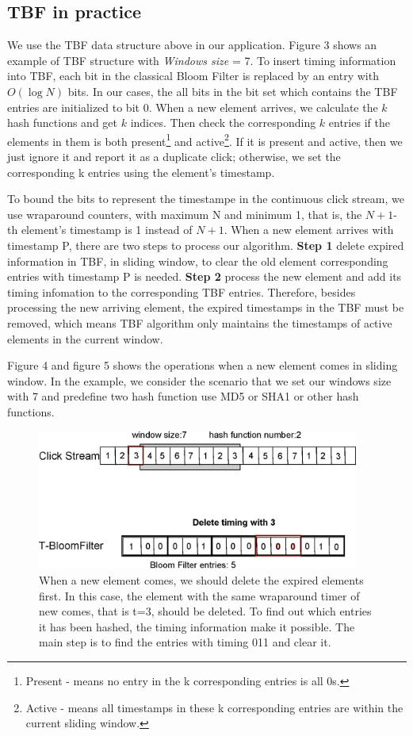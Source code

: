 \documentclass[runningheads,report]{llncs}
\begin{document}
\subsection{TBF in practice}

We use the TBF data structure above in our application. Figure 3 shows an example of TBF structure with \textit{Windows size} = 7. To insert timing information into TBF, each bit in the classical Bloom Filter is replaced by an entry with $O(\log N)$ bits. In our cases, the all bits in the bit set which contains the TBF entries are initialized to bit 0. When a new element arrives, we calculate the $k$ hash functions and get $k$ indices. Then check the corresponding $k$ entries if the elements in them is both present\footnote{Present - means no entry in the k corresponding entries is all 0s.} and active\footnote{Active - means all timestamps in these k corresponding entries are within the current sliding window.}. If it is present and active, then we just ignore it and report it as a duplicate click; otherwise, we set the corresponding k entries using the element's timestamp\cite{DBLP:conf/icdcs/ZhangG08}.


To bound the bits to represent the timestampe in the continuous click stream, we use wraparound counters, with maximum N and minimum 1, that is, the $N+1$-th element's timestamp is 1 instead of $N+1$. When a new element arrives with timestamp P, there are two steps to process our algorithm. \textbf{Step 1} delete expired information in TBF, in sliding window, to clear the old element corresponding entries with timestamp P is needed. \textbf{Step 2} process the new element and add its timing infomation to the corresponding TBF entries. Therefore, besides processing the new arriving element, the expired timestamps in the TBF must be removed, which means TBF algorithm only maintains the timestamps of active elements in the current window.

Figure 4 and figure 5 shows the operations when a new element comes in sliding window. In the example, we consider the scenario that we set our windows size with 7 and predefine two hash function use MD5 or SHA1 or other hash functions. 

\begin{figure}
\centering
\includegraphics[height=4.6cm]{pic/delete}
\caption{When a new element comes, we should delete the expired elements first. In this case, the element with the same wraparound timer of new comes, that is t=3, should be deleted. To find out which entries it has been hashed, the timing information make it possible. The main step is to find the entries with timing 011 and clear it.}
\label{fig:delete}
\end{figure}
\end{document}
